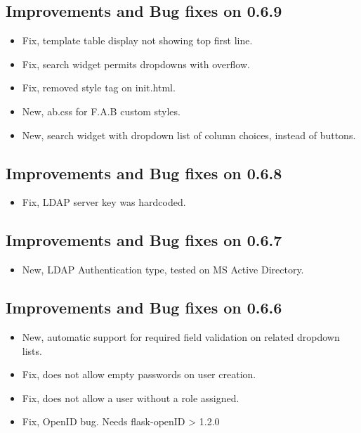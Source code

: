 \documentclass[letterpaper,10pt,english]{sphinxmanual}
\begin{document}
\subsection{Improvements and Bug fixes on 0.6.9}
\label{versions:improvements-and-bug-fixes-on-0-6-9}\begin{itemize}
\item {} 
Fix, template table display not showing top first line.

\item {} 
Fix, search widget permits dropdowns with overflow.

\item {} 
Fix, removed style tag on init.html.

\item {} 
New, ab.css for F.A.B custom styles.

\item {} 
New, search widget with dropdown list of column choices, instead of buttons.

\end{itemize}


\subsection{Improvements and Bug fixes on 0.6.8}
\label{versions:improvements-and-bug-fixes-on-0-6-8}\begin{itemize}
\item {} 
Fix, LDAP server key was hardcoded.

\end{itemize}


\subsection{Improvements and Bug fixes on 0.6.7}
\label{versions:improvements-and-bug-fixes-on-0-6-7}\begin{itemize}
\item {} 
New, LDAP Authentication type, tested on MS Active Directory.

\end{itemize}


\subsection{Improvements and Bug fixes on 0.6.6}
\label{versions:improvements-and-bug-fixes-on-0-6-6}\begin{itemize}
\item {} 
New, automatic support for required field validation on related dropdown lists.

\item {} 
Fix, does not allow empty passwords on user creation.

\item {} 
Fix, does not allow a user without a role assigned.

\item {} 
Fix, OpenID bug. Needs flask-openID \textgreater{} 1.2.0

\end{itemize}
\end{document}
